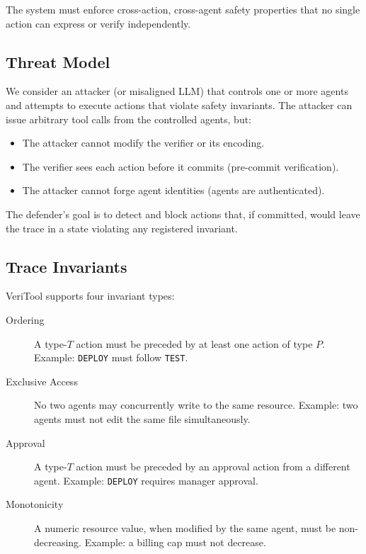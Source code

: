 \documentclass[10pt,twocolumn]{article}
\begin{document}
The system must enforce cross-action, cross-agent safety properties that
no single action can express or verify independently.

\subsection{Threat Model}

We consider an attacker (or misaligned LLM) that controls one or more agents
and attempts to execute actions that violate safety invariants. The attacker
can issue arbitrary tool calls from the controlled agents, but:

\begin{itemize}
\item The attacker cannot modify the verifier or its encoding.
\item The verifier sees each action before it commits (pre-commit
  verification).
\item The attacker cannot forge agent identities (agents are authenticated).
\end{itemize}

The defender's goal is to detect and block actions that, if committed,
would leave the trace in a state violating any registered invariant.

\subsection{Trace Invariants}

VeriTool supports four invariant types:

\begin{description}
\item[Ordering] A type-$T$ action must be preceded by at least one action
  of type $P$.  Example: \texttt{DEPLOY} must follow \texttt{TEST}.
\item[Exclusive Access] No two agents may concurrently write to the same
  resource.  Example: two agents must not edit the same file simultaneously.
\item[Approval] A type-$T$ action must be preceded by an approval action
  from a different agent.  Example: \texttt{DEPLOY} requires manager approval.
\item[Monotonicity] A numeric resource value, when modified by the same
  agent, must be non-decreasing.  Example: a billing cap must not decrease.
\end{description}

\end{document}
